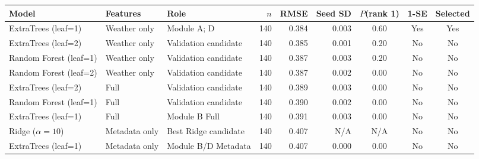 \begin{tabular}{lllrrrccc}
\toprule
Model & Features & Role & $n$ & RMSE & Seed SD & $P$(rank 1) & 1-SE & Selected \\
\midrule
ExtraTrees (leaf=1) & Weather only & Module A; D & 140 & 0.384 & 0.003 & 0.60 & Yes & Yes \\
ExtraTrees (leaf=2) & Weather only & Validation candidate & 140 & 0.385 & 0.001 & 0.20 & No & No \\
Random Forest (leaf=1) & Weather only & Validation candidate & 140 & 0.387 & 0.003 & 0.20 & No & No \\
Random Forest (leaf=2) & Weather only & Validation candidate & 140 & 0.387 & 0.002 & 0.00 & No & No \\
ExtraTrees (leaf=2) & Full & Validation candidate & 140 & 0.389 & 0.003 & 0.00 & No & No \\
Random Forest (leaf=1) & Full & Validation candidate & 140 & 0.390 & 0.002 & 0.00 & No & No \\
ExtraTrees (leaf=1) & Full & Module B Full & 140 & 0.391 & 0.003 & 0.00 & No & No \\
Ridge ($\alpha=10$) & Metadata only & Best Ridge candidate & 140 & 0.407 & N/A & N/A & No & No \\
ExtraTrees (leaf=1) & Metadata only & Module B/D Metadata & 140 & 0.407 & 0.000 & 0.00 & No & No \\
\bottomrule
\end{tabular}
